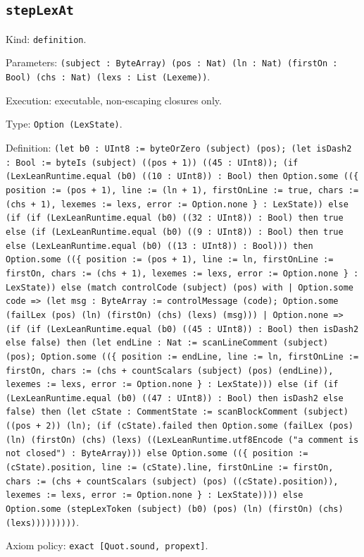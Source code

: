 \documentclass[11pt]{article}
\begin{document}
\subsection*{\texttt{stepLexAt}}
\noindent Kind: \texttt{definition}.\par
\noindent Parameters: \texttt{(subject : ByteArray) (pos : Nat) (ln : Nat) (firstOn : Bool) (chs : Nat) (lexs : List (Lexeme))}.\par
\noindent Execution: executable, non-escaping closures only.\par
\noindent Type: \texttt{Option (LexState)}.\par
\noindent Definition: \texttt{(let b0 : UInt8 := byteOrZero (subject) (pos); (let isDash2 : Bool := byteIs (subject) ((pos + 1)) ((45 : UInt8)); (if (LexLeanRuntime.equal (b0) ((10 : UInt8)) : Bool) then Option.some ((\{ position := (pos + 1), line := (ln + 1), firstOnLine := true, chars := (chs + 1), lexemes := lexs, error := Option.none \} : LexState)) else (if (if (LexLeanRuntime.equal (b0) ((32 : UInt8)) : Bool) then true else (if (LexLeanRuntime.equal (b0) ((9 : UInt8)) : Bool) then true else (LexLeanRuntime.equal (b0) ((13 : UInt8)) : Bool))) then Option.some ((\{ position := (pos + 1), line := ln, firstOnLine := firstOn, chars := (chs + 1), lexemes := lexs, error := Option.none \} : LexState)) else (match controlCode (subject) (pos) with | Option.some code => (let msg : ByteArray := controlMessage (code); Option.some (failLex (pos) (ln) (firstOn) (chs) (lexs) (msg))) | Option.none => (if (if (LexLeanRuntime.equal (b0) ((45 : UInt8)) : Bool) then isDash2 else false) then (let endLine : Nat := scanLineComment (subject) (pos); Option.some ((\{ position := endLine, line := ln, firstOnLine := firstOn, chars := (chs + countScalars (subject) (pos) (endLine)), lexemes := lexs, error := Option.none \} : LexState))) else (if (if (LexLeanRuntime.equal (b0) ((47 : UInt8)) : Bool) then isDash2 else false) then (let cState : CommentState := scanBlockComment (subject) ((pos + 2)) (ln); (if (cState).failed then Option.some (failLex (pos) (ln) (firstOn) (chs) (lexs) ((LexLeanRuntime.utf8Encode ("a comment is not closed") : ByteArray))) else Option.some ((\{ position := (cState).position, line := (cState).line, firstOnLine := firstOn, chars := (chs + countScalars (subject) (pos) ((cState).position)), lexemes := lexs, error := Option.none \} : LexState)))) else Option.some (stepLexToken (subject) (b0) (pos) (ln) (firstOn) (chs) (lexs)))))))))}.\par
\noindent Axiom policy: \texttt{exact [Quot.sound, propext]}.\par
\end{document}
